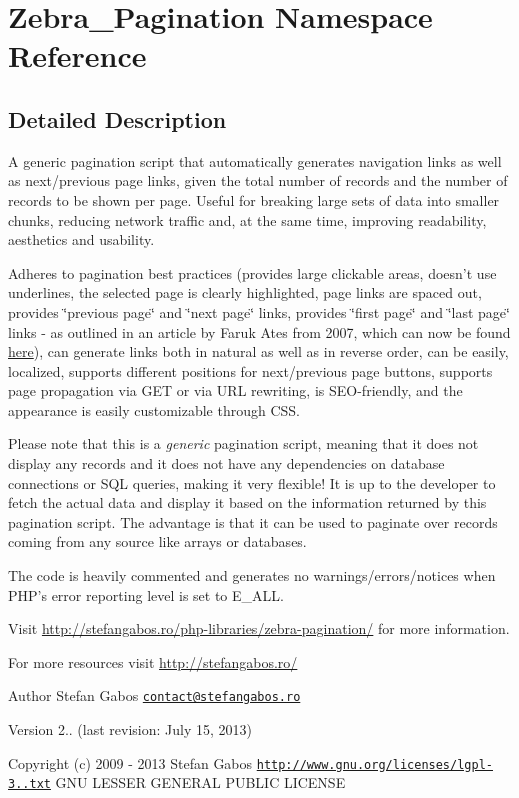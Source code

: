\hypertarget{namespace_zebra___pagination}{\section{Zebra\-\_\-\-Pagination Namespace Reference}
\label{namespace_zebra___pagination}
}


\subsection{Detailed Description}
A generic pagination script that automatically generates navigation links as well as next/previous page links, given the total number of records and the number of records to be shown per page. Useful for breaking large sets of data into smaller chunks, reducing network traffic and, at the same time, improving readability, aesthetics and usability.

Adheres to pagination best practices (provides large clickable areas, doesn't use underlines, the selected page is clearly highlighted, page links are spaced out, provides \char`\"{}previous page\char`\"{} and \char`\"{}next page\char`\"{} links, provides \char`\"{}first page\char`\"{} and \char`\"{}last page\char`\"{} links -\/ as outlined in an article by Faruk Ates from 2007, which can now be found \hyperlink{}{here}), can generate links both in natural as well as in reverse order, can be easily, localized, supports different positions for next/previous page buttons, supports page propagation via G\-E\-T or via U\-R\-L rewriting, is S\-E\-O-\/friendly, and the appearance is easily customizable through C\-S\-S.

Please note that this is a {\itshape generic} pagination script, meaning that it does not display any records and it does not have any dependencies on database connections or S\-Q\-L queries, making it very flexible! It is up to the developer to fetch the actual data and display it based on the information returned by this pagination script. The advantage is that it can be used to paginate over records coming from any source like arrays or databases.

The code is heavily commented and generates no warnings/errors/notices when P\-H\-P's error reporting level is set to E\-\_\-\-A\-L\-L.

Visit \hyperlink{}{http\-://stefangabos.\-ro/php-\/libraries/zebra-\/pagination/} for more information.

For more resources visit \hyperlink{}{http\-://stefangabos.\-ro/}

\begin{DoxyAuthor}{Author}
Stefan Gabos \href{mailto:contact@stefangabos.ro}{\tt contact@stefangabos.\-ro} 
\end{DoxyAuthor}
\begin{DoxyVersion}{Version}
2.. (last revision\-: July 15, 2013) 
\end{DoxyVersion}
\begin{DoxyCopyright}{Copyright}
(c) 2009 -\/ 2013 Stefan Gabos  \href{http://www.gnu.org/licenses/lgpl-3.0.txt}{\tt http\-://www.\-gnu.\-org/licenses/lgpl-\/3..\-txt} G\-N\-U L\-E\-S\-S\-E\-R G\-E\-N\-E\-R\-A\-L P\-U\-B\-L\-I\-C L\-I\-C\-E\-N\-S\-E 
\end{DoxyCopyright}
